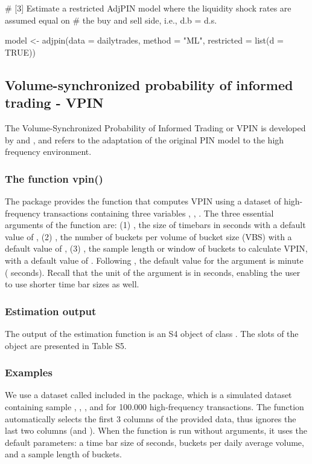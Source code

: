 \begin{example}
# [3] Estimate a restricted AdjPIN model where the liquidity shock rates are assumed equal on
# the buy and sell side, i.e., d.b = d.s.

model <- adjpin(data = dailytrades, method = "ML", restricted = list(d = TRUE))
\end{example}

\subsection{Volume-synchronized probability of informed trading - VPIN}

The Volume-Synchronized Probability of Informed Trading or VPIN is developed by \cite{Easley2011microstructure} and \cite{Easley2012Flow}, and refers to the adaptation of the original PIN model to the high frequency environment. 

\subsubsection{The function vpin()}
The package provides the function  that computes VPIN using a dataset of high-frequency transactions containing three variables , , .  The three essential arguments of the function are: (1) , the size of timebars in seconds with a default value of , (2) , the number of buckets per volume of bucket size (VBS) with a default value of , (3) , the sample length or window of buckets to calculate VPIN, with a default value of . Following \cite{Easley2011microstructure, Easley2012Flow}, the default value for the argument  is  minute ( seconds). Recall that the unit of the argument  is in seconds, enabling the user to use shorter time bar sizes as well.

\subsubsection{Estimation output}

The output of the estimation function  is an S4 object of class . The slots of the  object are presented in Table S5.

\subsubsection{Examples}
We use a dataset called  included in the package, which is a simulated dataset containing sample , , ,  and  for 100.000 high-frequency transactions. The function automatically selects the first 3 columns of the provided data, thus ignores the last two columns (and ). When the function  is run without arguments, it uses the default parameters: a time bar size of  seconds,  buckets per daily average volume, and a sample length of  buckets. 

